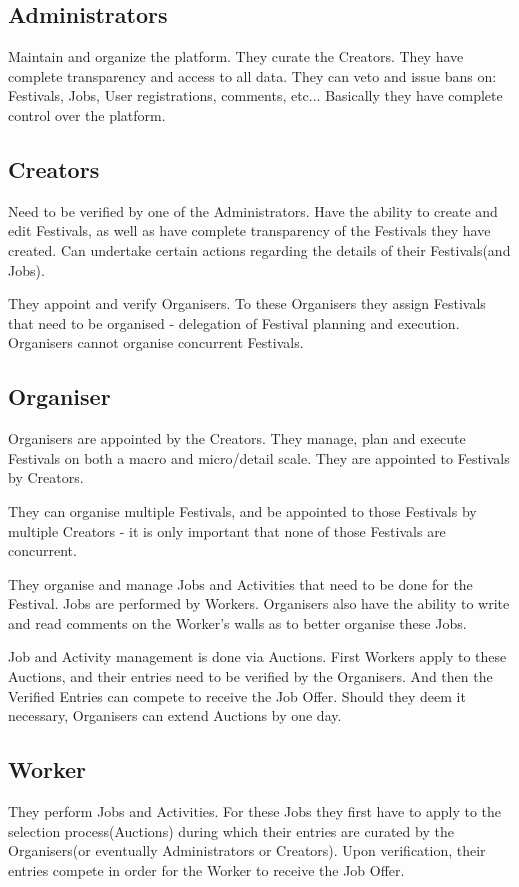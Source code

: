 		\subsection{Administrators}
		Maintain and organize the platform. They curate the Creators. They have complete transparency and access to all data. They can veto and issue bans on: Festivals, Jobs, User registrations, comments, etc... Basically they have complete control over the platform.	
		
		\subsection{Creators}
		Need to be verified by one of the Administrators. Have the ability to create and edit Festivals, as well as have complete transparency of the Festivals they have created. Can undertake certain actions regarding the details of their Festivals(and Jobs).
		
		They appoint and verify Organisers. To these Organisers they assign Festivals that need to be organised - delegation of Festival planning and execution. Organisers cannot organise concurrent Festivals.
		
		\subsection{Organiser}
		Organisers are appointed by the Creators. They manage, plan and execute Festivals on both a macro and micro/detail scale. They are appointed to Festivals by Creators.
		
		They can organise multiple Festivals, and be appointed to those Festivals by multiple Creators - it is only important that none of those Festivals are concurrent.
		
		They organise and manage Jobs and Activities that need to be done for the Festival. Jobs are performed by Workers. Organisers also have the ability to write and read comments on the Worker's walls as to better organise these Jobs.
		
		 Job and Activity management is done via Auctions. First Workers apply to these Auctions, and their entries need to be verified by the Organisers. And then the Verified Entries can compete to receive the Job Offer. Should they deem it necessary, Organisers can extend Auctions by one day.
		
		\subsection{Worker}
		They perform Jobs and Activities. For these Jobs they first have to apply to the selection process(Auctions) during which their entries are curated by the Organisers(or eventually Administrators or Creators). Upon verification, their entries compete in order for the Worker to receive the Job Offer.
		
